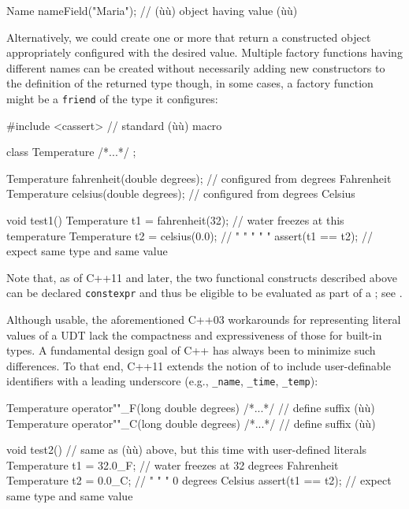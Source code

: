 \begin{emcppslisting}
Name nameField("Maria");  // (ù{}ù) object having value (ù{}ù)
\end{emcppslisting}
    
\noindent Alternatively, we could create one or more 
that return a constructed object appropriately configured with the
desired value. Multiple factory functions having different names can be
created without necessarily adding new constructors to the definition of
the returned type though, in some cases, a factory function might be a
\lstinline!friend! of the type it configures:

\begin{emcppslisting}
#include <cassert>  // standard (ù{}ù) macro

class Temperature { /*...*/ };

Temperature fahrenheit(double degrees);  // configured from degrees Fahrenheit
Temperature celsius(double degrees);     // configured from degrees Celsius

void test1()
{
    Temperature t1 = fahrenheit(32);  // water freezes at this temperature
    Temperature t2 = celsius(0.0);    //   "      "     "  "        "
    assert(t1 == t2);                 // expect same type and same value
}
\end{emcppslisting}
    
\noindent  Note that, as of C++11 and later, the two functional constructs
described above can be declared \lstinline!constexpr! and thus be eligible
to be evaluated as part of a ; see
. 

Although usable, the aforementioned C++03 workarounds for representing
literal values of a UDT lack the compactness and expressiveness of those
for built-in types. A fundamental design goal of C++ has always been to
minimize such differences. To that end, C++11 extends the notion of
 to include user-definable identifiers with
a leading underscore (e.g., \lstinline!_name!, \lstinline!_time!,
\lstinline!_temp!):

\begin{emcppslisting}
Temperature operator""_F(long double degrees) { /*...*/ }  // define suffix (ù{}ù)
Temperature operator""_C(long double degrees) { /*...*/ }  // define suffix (ù{}ù)

void test2()  // same as (ù{}ù) above, but this time with user-defined literals
{
    Temperature t1 = 32.0_F; // water freezes at 32 degrees Fahrenheit
    Temperature t2 = 0.0_C;  //   "      "     "  0 degrees Celsius
    assert(t1 == t2);        // expect same type and same value
}
\end{emcppslisting}
    

